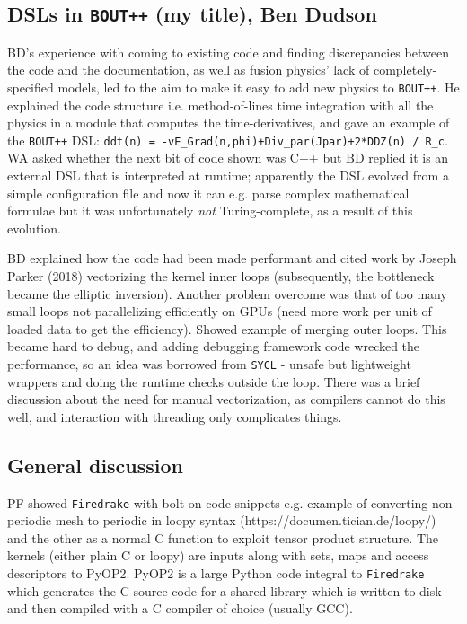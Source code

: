 \documentclass[11pt]{article}
\begin{document}
\subsection{DSLs in {\tt BOUT++} (my title), Ben Dudson}

BD's experience with coming to existing code and finding discrepancies between 
the code and the documentation, as well as fusion physics' lack of 
completely-specified models, led to the aim to make it easy to add new physics 
to {\tt BOUT++}.  He explained the code structure i.e. method-of-lines time 
integration with all the physics in a module that computes the 
time-derivatives, and gave an example of the {\tt BOUT++} DSL: {\tt ddt(n) = 
-vE\_Grad(n,phi)+Div\_par(Jpar)+2*DDZ(n) / R\_c}.  WA asked whether the next 
bit of code shown was C++ but BD replied it is an external DSL that is 
interpreted at runtime; apparently the DSL evolved from a simple configuration 
file and now it can e.g. parse complex mathematical formulae but it was
unfortunately  {\it not} Turing-complete, as a result of this evolution. %

BD explained how the code had been made performant and cited work by Joseph 
Parker (2018) vectorizing the kernel inner loops (subsequently, the bottleneck 
became the elliptic inversion).  Another problem overcome was that of too many 
small loops not parallelizing efficiently on GPUs (need more work per unit of 
loaded data to get the efficiency).  Showed example of merging outer loops.  
This became hard to debug, and adding debugging framework code wrecked the 
performance, so an idea was borrowed from {\tt SYCL} - unsafe but lightweight 
wrappers and doing the runtime checks outside the loop.  There was a brief 
discussion about the need for manual vectorization, as compilers cannot do this 
well, and interaction with threading only complicates things.

\subsection{General discussion} \label{discussion}

PF showed {\tt Firedrake} with bolt-on code snippets e.g. example of converting 
non-periodic mesh to periodic in loopy syntax (https://documen.tician.de/loopy/)
and the other as a normal C function  to exploit tensor product structure.
The kernels (either plain C or loopy) are inputs along with sets, maps and
access descriptors to PyOP2. PyOP2 is a large Python code integral to
{\tt Firedrake} which generates the C source code for a shared library
which is written to disk and then compiled with a C compiler of choice (usually GCC).
\end{document}
